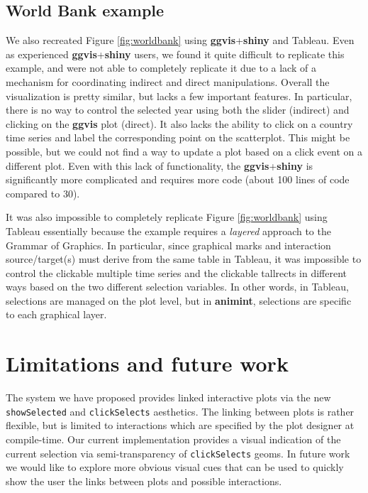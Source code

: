 \documentclass[12pt,]{article}
\theoremstyle{definition}
\theoremstyle{definition}
\theoremstyle{definition}
\theoremstyle{remark}
\begin{document}
\hypertarget{world-bank-example}{%
\subsection{World Bank example}\label{world-bank-example}}

We also recreated Figure \ref{fig:worldbank} using
\textbf{ggvis}+\textbf{shiny} and Tableau. Even as experienced
\textbf{ggvis}+\textbf{shiny} users, we found it quite difficult to
replicate this example, and were not able to completely replicate it due
to a lack of a mechanism for coordinating indirect and direct
manipulations. Overall the visualization is pretty similar, but lacks a
few important features. In particular, there is no way to control the
selected year using both the slider (indirect) and clicking on the
\textbf{ggvis} plot (direct). It also lacks the ability to click on a
country time series and label the corresponding point on the
scatterplot. This might be possible, but we could not find a way to
update a plot based on a click event on a different plot. Even with this
lack of functionality, the \textbf{ggvis}+\textbf{shiny} is
significantly more complicated and requires more code (about 100 lines
of code compared to 30).

It was also impossible to completely replicate Figure
\ref{fig:worldbank} using Tableau essentially because the example
requires a \emph{layered} approach to the Grammar of Graphics. In
particular, since graphical marks and interaction source/target(s) must
derive from the same table in Tableau, it was impossible to control the
clickable multiple time series and the clickable tallrects in different
ways based on the two different selection variables. In other words, in
Tableau, selections are managed on the plot level, but in
\textbf{animint}, selections are specific to each graphical layer.

\hypertarget{limitations}{%
\section{Limitations and future work}\label{limitations}}

The system we have proposed provides linked interactive plots via the
new \texttt{showSelected} and \texttt{clickSelects} aesthetics. The
linking between plots is rather flexible, but is limited to interactions
which are specified by the plot designer at compile-time. Our current
implementation provides a visual indication of the current selection via
semi-transparency of \texttt{clickSelects} geoms. In future work we
would like to explore more obvious visual cues that can be used to
quickly show the user the links between plots and possible interactions.
\end{document}
